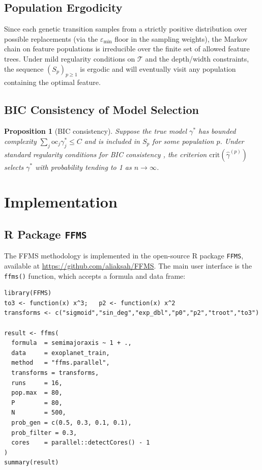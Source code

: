 \documentclass[12pt,a4paper]{article}
\newtheorem{proposition}{Proposition}
\newcommand{\oc}{\mathrm{oc}}
\begin{document}
\subsection{Population Ergodicity}

Since each genetic transition samples from a strictly positive distribution
over possible replacements (via the $\varepsilon_{\min}$ floor in the sampling
weights), the Markov chain on feature populations is irreducible over the finite
set of allowed feature trees.  Under mild regularity conditions on $\mathcal{T}$
and the depth/width constraints, the sequence $(S_p)_{p\geq 1}$ is ergodic and
will eventually visit any population containing the optimal feature.

\subsection{BIC Consistency of Model Selection}

\begin{proposition}[BIC consistency]
  Suppose the true model $\gamma^*$ has bounded complexity $\sum_j
  \oc_j\gamma^*_j \leq C$ and is included in $S_p$ for some population $p$.
  Under standard regularity conditions for BIC consistency \citep{Schwarz1978},
  the criterion $\mathrm{crit}(\hat\gamma^{(p)})$ selects $\gamma^*$ with
  probability tending to 1 as $n\to\infty$.
\end{proposition}

\section{Implementation}
\label{sec:implementation}

\subsection{R Package \texttt{FFMS}}

The FFMS methodology is implemented in the open-source R package \texttt{FFMS},
available at \url{https://github.com/aliaksah/FFMS}.  The main user interface is
the \texttt{ffms()} function, which accepts a formula and data frame:

\begin{verbatim}
library(FFMS)
to3 <- function(x) x^3;   p2 <- function(x) x^2
transforms <- c("sigmoid","sin_deg","exp_dbl","p0","p2","troot","to3")

result <- ffms(
  formula  = semimajoraxis ~ 1 + .,
  data     = exoplanet_train,
  method   = "ffms.parallel",
  transforms = transforms,
  runs     = 16,
  pop.max  = 80,
  P        = 80,
  N        = 500,
  prob_gen = c(0.5, 0.3, 0.1, 0.1),
  prob_filter = 0.3,
  cores    = parallel::detectCores() - 1
)
summary(result)
\end{verbatim}
\end{document}
